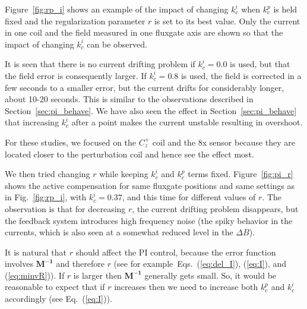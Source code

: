 Figure~\ref{fig:rp_i} shows an example of the impact of changing
$k_c^i$ when $k_c^p$ is held fixed and the regularization parameter
$r$ is set to its best value.  Only the current in one coil and the
field measured in one fluxgate axis are shown so that the impact of
changing $k_c^i$ can be observed.

It is seen that there is no current drifting problem if $k_c^i=0.0$ is
used, but that the field error is consequently larger.  If $k_c^i=0.8$
is used, the field is corrected in a few seconds to a smaller error,
but the current drifts for considerably longer, about 10-20 seconds.
This is similar to the observations described in
Section~\ref{sec:pi_behave}.  We have also seen the effect in
Section~\ref{sec:pi_behave} that increasing $k_c^i$ after a point
makes the current unstable resulting in overshoot.

For these studies, we focused on the $C_z^+$ coil and the 8x sensor
because they are located closer to the perturbation coil and hence see the effect most.



We then tried changing $r$ while keeping $k_c^i$ and $k_c^p$ terms
fixed.  Figure~\ref{fig:pi_r} shows the active compensation for same
fluxgate positions and same settings as in Fig.~\ref{fig:rp_i}, with
$k_c^i=0.37$, and this time for different values of $r$. The
observation is that for decreasing $r$, the current drifting problem
disappears, but the feedback system introduces high frequency noise (the spiky behavior in the currents, which is also seen at a somewhat reduced level in the $\Delta B$).

It is natural that $r$ should affect the PI control, because the error
function involves $\bm{M^{-1}}$ and therefore $r$ (see
for example~Eqs.~(\ref{eq:del_I}), (\ref{eq:I}), and (\ref{eq:minvR})).  If
$r$ is larger then $\bm{M^{-1}}$ generally gets small.  So, it would be
reasonable to expect that if $r$ increases then we need to increase
both $k_c^p$ and $k_c^i$ accordingly (see Eq.~(\ref{eq:I})).


